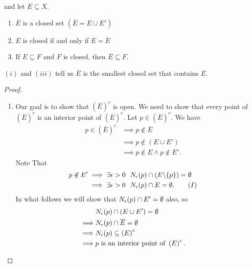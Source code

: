 \begin{theorem}
    \routineMS and let $E\subseteq X.$
    \begin{enumerate}[$(i)$]
        \item $\overline{E}$ is a closed set $(\overline{E}=E \cup E')$
        \item $E$ is closed if and only if $E=\overline{E}$
        \item If $E\subseteq F$ and $F$ is closed, then $\overline{E} \subseteq F$.
    \end{enumerate}
    \begin{note}
        $(i)$ and $(iii)$ tell us $\overline{E}$ is the smallest closed set that contains $E$.
    \end{note}
\end{theorem}

\begin{proof}
    \begin{enumerate}[$(i)$]
        \item Our goal is to show that $\left(\overline{E}\right)^c$ is open. We need to show that every point of $\left(\overline{E}\right)^c$ is an interior point of $\left(\overline{E}\right)^c$. Let $p\in \left(\overline{E}\right)^c.$ We have 
        \begin{align*}
            p\in \left(\overline{E}\right)^c &\implies p \not \in \overline{E} \\
            &\implies p \not \in (E\cup E') \\
            &\implies p \not \in E \wedge p \not \in E'.
        \end{align*}
        Note That
        \begin{align*}
            p\not \in E' &\implies \exists \epsilon > 0 ~~N_{\epsilon}(p)\cap \left(E \backslash \{p\}\right) = \emptyset \\
            &\implies \exists \epsilon > 0 ~~N_{\epsilon}(p) \cap E = \emptyset. \tag{$I$}
        \end{align*}
        In what follows we will show that $N_{\epsilon}(p)\cap E'= \emptyset$ also, so 
        \begin{align*}
            &\nbhd{\epsilon}{p}\cap \left(E \cup E'\right) = \emptyset \\
            \implies &\nbhd{\epsilon}{p}\cap \overline{E} = \emptyset \\
            \implies &\nbhd{\epsilon}{p} \subseteq \left(E\right)^c \\
            \implies &p \text{ is an interior point of } \left(E\right)^c.

\end{align*}
\end{enumerate}
\end{proof}
